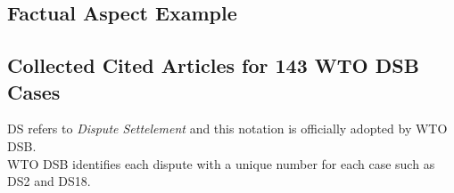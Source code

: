 \documentclass[12pt,letterpaper]{article}
\begin{document}
\clearpage
\begin{appendices}
  \section{}
  \label{sec:appendix}


  \subsection{Factual Aspect Example}
  \label{sub:factual-aspect-example}
  



  \subsection{Collected Cited Articles for 143 WTO DSB Cases}
  DS refers to \textit{Dispute Settelement} and this notation is officially adopted by WTO DSB.\\
  WTO DSB identifies each dispute with a unique number for each case such as DS2 and DS18.
  \label{sub:cited-articles-table}
  



\end{appendices}
\end{document}
